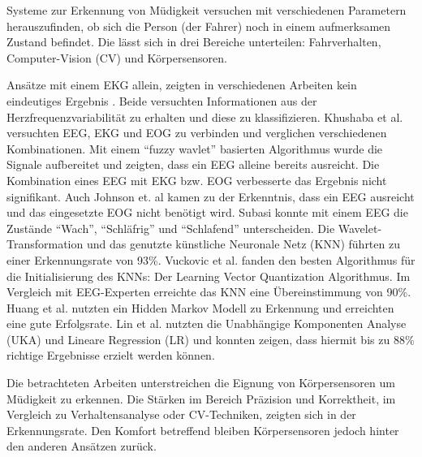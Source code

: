 \label{chap:state}
Systeme zur Erkennung von Müdigkeit versuchen mit verschiedenen Parametern herauszufinden, ob sich die Person (der Fahrer) noch in einem aufmerksamen Zustand befindet. Die lässt sich in drei Bereiche unterteilen: Fahrverhalten, Computer-Vision (CV) und Körpersensoren. 
\comp

Ansätze mit einem EKG allein, zeigten in verschiedenen Arbeiten kein eindeutiges Ergebnis \cite{Vicente_6164509}\cite{Rogado_4913155}. Beide versuchten Informationen aus der Herzfrequenzvariabilität zu erhalten und diese zu klassifizieren. 
Khushaba et al. \cite{Khushaba_5580017} versuchten EEG, EKG und EOG zu verbinden und verglichen verschiedenen Kombinationen. Mit einem "`fuzzy wavlet"' basierten Algorithmus wurde die Signale aufbereitet und zeigten, dass ein EEG alleine bereits ausreicht. Die Kombination eines EEG mit EKG bzw. EOG verbesserte das Ergebnis nicht signifikant. Auch Johnson et. al \cite{Johnson11} kamen zu der Erkenntnis, dass ein EEG ausreicht und das eingesetzte EOG nicht benötigt wird. Subasi \cite{Subasi:2005:ARA:1707423.1707550} konnte mit einem EEG die Zustände "`Wach"', "`Schläfrig"' und "`Schlafend"' unterscheiden. Die Wavelet-Transformation und das genutzte künstliche Neuronale Netz (KNN) führten zu einer Erkennungsrate von 93\%. Vuckovic et al. \cite{Vuckovic2002349} fanden den besten Algorithmus für die Initialisierung des KNNs: Der Learning Vector Quantization Algorithmus. Im Vergleich mit EEG-Experten erreichte das KNN eine Übereinstimmung von 90\%. Huang et al. \cite{Huang_548971} nutzten ein Hidden Markov Modell zu Erkennung und erreichten eine gute Erfolgsrate. Lin et al. \cite{Lin05eeg-baseddrowsiness} nutzten die Unabhängige Komponenten Analyse (UKA) und Lineare Regression (LR) und konnten zeigen, dass hiermit  bis zu 88\% richtige Ergebnisse erzielt werden können. 


Die betrachteten Arbeiten unterstreichen die Eignung von Körpersensoren  um Müdigkeit zu erkennen. Die Stärken im Bereich Präzision und Korrektheit, im Vergleich zu Verhaltensanalyse oder CV-Techniken, zeigten sich in der Erkennungsrate. Den Komfort betreffend bleiben Körpersensoren jedoch hinter den anderen Ansätzen zurück. 


